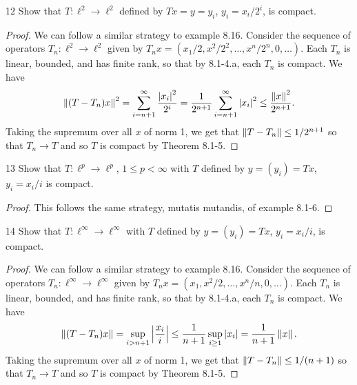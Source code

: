 \begin{exercise}{12}
Show that $T: \ell^2 \to \ell^2$ defined by $Tx = y = y_i$, $y_i = x_i/2^i$, is compact.
\end{exercise}
\begin{proof}
We can follow a similar strategy to example 8.16.
Consider the sequence of operators $T_n: \ell^2 \to \ell^2$ given by $T_n x = (x_1 / 2, x^2 / 2^2, \dots, x^n / 2^n, 0,  \dots)$.
Each $T_n$ is linear, bounded, and has finite rank, so that by 8.1-4.a, each $T_n$ is compact.
We have
\begin{align*}
    \left\lVert (T - T_n) x\right\rVert^2
    = \sum_{i = n+1}^\infty \frac{\left\lvert x_i\right\rvert^2}{2^i}
    = \frac{1}{2^{n+1}}\sum_{i = n+1}^\infty \left\lvert x_i\right\rvert^2
    \leq \frac{\left\lVert x\right\rVert^2}{2^{n+1}}.
\end{align*}
Taking the supremum over all $x$ of norm 1, we get that $\left\lVert T - T_n\right\rVert \leq 1/2^{n+1}$ so that $T_n \to T$ and so $T$ is compact by Theorem 8.1-5.
\end{proof} 

\begin{exercise}{13}
Show that $T: \ell^p \to \ell^p$, $1 \leq p < \infty$ with $T$ defined by $y = (y_i) = Tx$, $y_i = x_i / i$ is compact.
\end{exercise}
\begin{proof}
This follows the same strategy, mutatis mutandis, of example 8.1-6.
\end{proof} 

\begin{exercise}{14}
Show that $T: \ell^\infty \to \ell^\infty$ with $T$ defined by $y = (y_i) = Tx$, $y_i = x_i/i$, is compact.
\end{exercise}
\begin{proof}
We can follow a similar strategy to example 8.16.
Consider the sequence of operators $T_n: \ell^\infty \to \ell^\infty$ given by $T_n x = (x_1, x^2 / 2, \dots, x^n / n, 0,  \dots)$.
Each $T_n$ is linear, bounded, and has finite rank, so that by 8.1-4.a, each $T_n$ is compact.
We have
\begin{align*}
    \left\lVert (T - T_n) x\right\rVert
    = \sup_{i > n + 1} \left\lvert \frac{x_i}{i}\right\rvert
    \leq \frac{1}{n+1}\sup_{i \geq 1} \left\lvert x_i\right\rvert
    = \frac{1}{n+1}\left\lVert x\right\rVert.
\end{align*}
Taking the supremum over all $x$ of norm 1, we get that $\left\lVert T - T_n\right\rVert \leq 1/(n+1)$ so that $T_n \to T$ and so $T$ is compact by Theorem 8.1-5.
\end{proof} 

